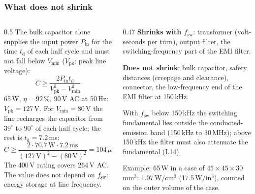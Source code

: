 \begin{frame}
	\frametitle{What does not shrink}
	\begin{columns}[T]
		\begin{column}{0.5\textwidth}
			\footnotesize
			The bulk capacitor alone supplies the input power $P_\mathrm{in}$ for the time $t_\mathrm{d}$ of each half cycle and must not fall below $V_\mathrm{min}$ ($V_\mathrm{pk}$: peak line voltage):
			\begin{equation*}
				C\geq\frac{2P_\mathrm{in}t_\mathrm{d}}{V_\mathrm{pk}^2-V_\mathrm{min}^2}
			\end{equation*}
			65\,W, $\eta=92$\,\%, 90\,V AC at 50\,Hz: $V_\mathrm{pk}=127$\,V. For $V_\mathrm{min}=80$\,V the line recharges the capacitor from $39^\circ$ to $90^\circ$ of each half cycle; the rest is $t_\mathrm{d}=7.2$\,ms:
			\begin{equation*}
				C\geq\frac{2\cdot70.7\,\mathrm{W}\cdot7.2\,\mathrm{ms}}{(127\,\mathrm{V})^2-(80\,\mathrm{V})^2}=104\,\mu\mathrm{F},\ 400\,\mathrm{V}
			\end{equation*}
			The 400\,V rating covers 264\,V AC. The value does not depend on $f_\mathrm{sw}$: energy storage at line frequency.
		\end{column}
		\begin{column}{0.47\textwidth}
			\footnotesize
			\textbf{Shrinks with $f_\mathrm{sw}$}: transformer (volt-seconds per turn), output filter, the switching-frequency part of the EMI filter.
			\vspace{0.2cm}

			\textbf{Does not shrink}: bulk capacitor, safety distances (creepage and clearance), connector, the low-frequency end of the EMI filter at 150\,kHz.
			\vspace{0.2cm}

			With $f_\mathrm{sw}$ below 150\,kHz the switching fundamental lies outside the conducted-emission band (150\,kHz to 30\,MHz); above 150\,kHz the filter must also attenuate the fundamental (L14).
			\vspace{0.2cm}

			Example: 65\,W in a case of $45\times45\times30$\,mm$^3$: 1.07\,W/cm$^3$ (17.5\,W/in$^3$), counted on the outer volume of the case.
		\end{column}
	\end{columns}
\end{frame}

